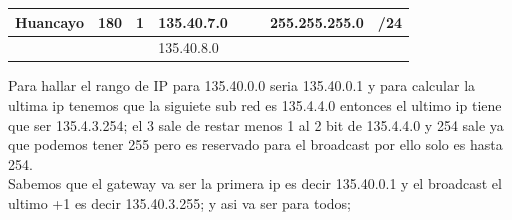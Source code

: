 \begin{table}[htbp]
\begin{tabular}{@{}llllllll@{}}
\multicolumn{1}{|l|}{Huancayo}                                & \multicolumn{1}{l|}{180}                                   & \multicolumn{1}{l|}{1}                                  & \multicolumn{1}{l|}{135.40.7.0}                                            & \multicolumn{1}{l|}{}                                          & \multicolumn{1}{l|}{}                                         & \multicolumn{1}{l|}{255.255.255.0}                            & \multicolumn{1}{l|}{/24}                                   \\ \midrule
                                                              &                                                            &                                                         & 135.40.8.0                                                                 &                                                                &                                                               &                                                               &                                                           
\end{tabular}
\end{table}

Para hallar el rango de IP para 135.40.0.0 seria 135.40.0.1 y para calcular la ultima ip tenemos que la siguiete sub red es 135.4.4.0 entonces el ultimo ip tiene que ser 135.4.3.254; el 3 sale de restar menos 1 al 2 bit de 135.4.4.0 y 254 sale ya que podemos tener 255 pero es reservado para el broadcast por ello solo es hasta 254.
\\
Sabemos que el gateway va ser la primera ip es decir 135.40.0.1 y el broadcast el ultimo +1 es decir 135.40.3.255; y asi va ser para todos;



